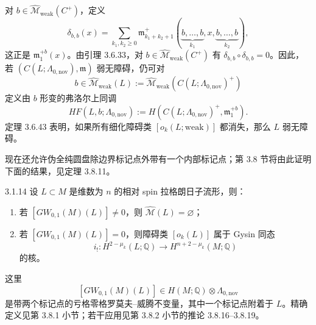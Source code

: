 对 $b\in\widehat{\mathcal M}_{\mathrm{weak}}(C^+)$，定义
\[
  \delta_{b,b}(x)
  =\sum_{k_1,k_2\geq0}
  \mathfrak m_{k_1+k_2+1}^+
  (\underbrace{b,\ldots,b}_{k_1},x,
   \underbrace{b,\ldots,b}_{k_2}),
\]
这正是 $\mathfrak m_1^{+b}(x)$。由引理 3.6.33，对
$b\in\widehat{\mathcal M}_{\mathrm{weak}}(C^+)$ 有
$\delta_{b,b}\circ\delta_{b,b}=0$。因此，若
$(C(L;\Lambda_{0,\mathrm{nov}}),\mathfrak m)$ 弱无障碍，仍可对
\[
  b\in\widehat{\mathcal M}_{\mathrm{weak}}(L)
  :=\widehat{\mathcal M}_{\mathrm{weak}}
  (C(L;\Lambda_{0,\mathrm{nov}})^+)
\]
定义由 $b$ 形变的弗洛尔上同调
\[
  HF(L,b;\Lambda_{0,\mathrm{nov}})
  :=H(C(L;\Lambda_{0,\mathrm{nov}})^+,\mathfrak m_1^{+b}).
\]
定理 3.6.43 表明，如果所有细化障碍类
$[o_k(L;\mathrm{weak})]$ 都消失，那么 $L$ 弱无障碍。

现在还允许伪全纯圆盘除边界标记点外带有一个内部标记点；第 3.8 节将由此证明下面的结果，见定理 3.8.11。

\begin{theorem}{3.1.14}\label{thm:3-1-14}
设 $L\subset M$ 是维数为 $n$ 的相对 spin 拉格朗日子流形，则：
\begin{enumerate}[label=\textup{(\arabic*)},leftmargin=2.8em]
  \item 若 $[GW_{0,1}(M)(L)]\neq0$，则
  $\widehat{\mathcal M}(L)=\varnothing$；
  \item 若 $[GW_{0,1}(M)(L)]=0$，则障碍类 $[o_k(L)]$ 属于
  Gysin 同态
  \[
    i_!\colon H^{2-\mu_k}(L;\mathbb Q)
    \longrightarrow H^{n+2-\mu_k}(M;\mathbb Q)
  \]
  的核。
\end{enumerate}
\end{theorem}

这里
\[
  [GW_{0,1}(M)(L)]
  \in H(M;\mathbb Q)\otimes\Lambda_{0,\mathrm{nov}}
\]
是带两个标记点的亏格零格罗莫夫--威腾不变量，其中一个标记点附着于
$L$。精确定义见第 3.8.1 小节；若干应用见第 3.8.2 小节的推论
3.8.16--3.8.19。

